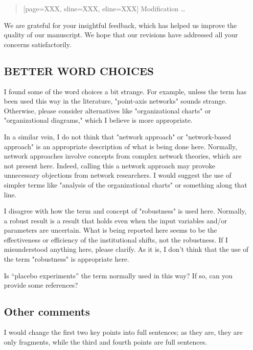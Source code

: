 \begin{quote}[page=XXX, sline=XXX, eline=XXX]
    Modification \dots
\end{quote}

\AR*{} We are grateful for your insightful feedback, which has helped us improve the quality of our manuscript. We hope that our revisions have addressed all your concerns satisfactorily.


\subsection{BETTER WORD CHOICES}\label{sec:1-2}
\RC{} I found some of the word choices a bit strange. For example, unless the term has been used this way in the literature, "point-axis networks" sounds strange. Otherwise, please consider alternatives like "organizational charts" or "organizational diagrams," which I believe is more appropriate.

\RC{} In a similar vein, I do not think that "network approach" or "network-based approach" is an appropriate description of what is being done here. Normally, network approaches involve concepts from complex network theories, which are not present here. Indeed, calling this a network approach may provoke unnecessary objections from network researchers. I would suggest the use of simpler terms like "analysis of the organizational charts" or something along that line.

\RC{} I disagree with how the term and concept of "robustness" is used here. Normally, a robust result is a result that holds even when the input variables and/or parameters are uncertain. What is being reported here seems to be the effectiveness or efficiency of the institutional shifts, not the robustness. If I misunderstood anything here, please clarify. As it is, I don't think that the use of the term "robustness" is appropriate here.

\RC{} Is ``placebo experiments'' the term normally used in this way? If so, can you provide some references?

\subsection{Other comments}\label{sec:1-3}
\RC{} I would change the first two key points into full sentences; as they are, they are only fragments, while the third and fourth points are full sentences.

